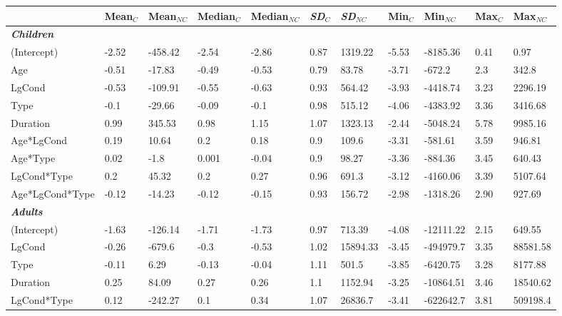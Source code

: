 \documentclass[authoryear, 12pt]{elsarticle}
\begin{document}
\linespread{1}
\begin{table}
  \begin{scriptsize}
\centering
  \begin{tabular}{lllllllllll}
    & Mean$_{C}$ & Mean$_{NC}$ & Median$_{C}$ & Median$_{NC}$ & \textit{SD}$_{C}$ & \textit{SD}$_{NC}$ & Min$_{C}$ & Min$_{NC}$ & Max$_{C}$ & Max$_{NC}$ \\ 
    \hline
	\textbf{\textit{Children}} &&&&& \\
    \hline
    (Intercept)					& -2.52	& -458.42	& -2.54	& -2.86	& 0.87	& 1319.22	& -5.53	& -8185.36		& 0.41	& 0.97 \\
    Age								& -0.51	& -17.83	& -0.49	& -0.53	& 0.79	& 83.78		& -3.71	& -672.2		& 2.3		& 342.8 \\
    LgCond							& -0.53	& -109.91	& -0.55	& -0.63	& 0.93	& 564.42	& -3.93	& -4418.74		& 3.23	& 2296.19 \\
    Type							& -0.1	& -29.66	& -0.09	& -0.1	& 0.98	& 515.12	& -4.06	& -4383.92		& 3.36	& 3416.68 \\
    Duration						& 0.99	& 345.53	& 0.98	& 1.15	& 1.07	& 1323.13	& -2.44	& -5048.24		& 5.78	& 9985.16 \\
    Age*LgCond					& 0.19	& 10.64		& 0.2		& 0.18	& 0.9		& 109.6		& -3.31	& -581.61		& 3.59	& 946.81 \\
    Age*Type						& 0.02	& -1.8		& 0.001	& -0.04	& 0.9		& 98.27		& -3.36	& -884.36		& 3.45	& 640.43 \\
    LgCond*Type					& 0.2		& 45.32		& 0.2		& 0.27	& 0.96	& 691.3		& -3.12	& -4160.06		& 3.39	& 5107.64 \\
    Age*LgCond*Type			& -0.12	& -14.23	& -0.12	& -0.15	& 0.93	& 156.72	& -2.98	& -1318.26		& 2.90	& 927.69 \\
    \hline
	\textbf{\textit{Adults}} &&&&& \\
    \hline
    (Intercept)    			& -1.63	& -126.14	& -1.71	& -1.73	& 0.97	& 713.39	& -4.08	& -12111.22	& 2.15	& 649.55		\\
    LgCond  						& -0.26	& -679.6	& -0.3	& -0.53	& 1.02	& 15894.33	& -3.45	& -494979.7	& 3.35	& 88581.58	\\
    Type 							& -0.11	& 6.29		& -0.13	& -0.04	& 1.11	& 501.5		& -3.85	& -6420.75		& 3.28	& 8177.88		\\
    Duration  					& 0.25	& 84.09		& 0.27	& 0.26	& 1.1		& 1152.94	& -3.25	& -10864.51	& 3.46	& 18540.62	\\
    LgCond*Type  				& 0.12	& -242.27	& 0.1		& 0.34	& 1.07	& 26836.7	& -3.41	& -622642.7	& 3.81	& 509198.4	\\

\end{tabular}
\end{scriptsize}
\end{table}
\end{document}
